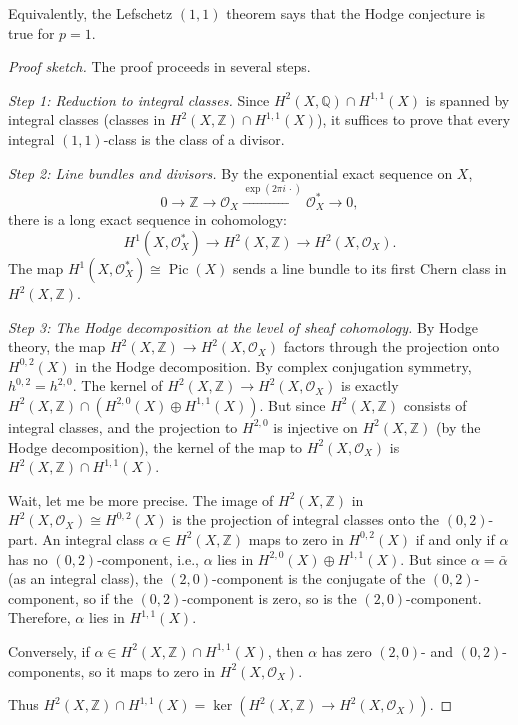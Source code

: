 Equivalently, the Lefschetz $(1,1)$ theorem says that the Hodge conjecture is true for $p = 1$.

\begin{proof}[Proof sketch]
The proof proceeds in several steps.

\emph{Step 1: Reduction to integral classes.} Since $H^2(X, \mathbb{Q}) \cap H^{1,1}(X)$ is spanned by integral classes (classes in $H^2(X, \mathbb{Z}) \cap H^{1,1}(X)$), it suffices to prove that every integral $(1,1)$-class is the class of a divisor.

\emph{Step 2: Line bundles and divisors.} By the exponential exact sequence on $X$,
\[
0 \to \mathbb{Z} \to \mathcal{O}_X \xrightarrow{\exp(2\pi i \,\cdot)} \mathcal{O}_X^* \to 0,
\]
there is a long exact sequence in cohomology:
\[
H^1(X, \mathcal{O}_X^*) \to H^2(X, \mathbb{Z}) \to H^2(X, \mathcal{O}_X).
\]
The map $H^1(X, \mathcal{O}_X^*) \cong \operatorname{Pic}(X)$ sends a line bundle to its first Chern class in $H^2(X, \mathbb{Z})$.

\emph{Step 3: The Hodge decomposition at the level of sheaf cohomology.} By Hodge theory, the map $H^2(X, \mathbb{Z}) \to H^2(X, \mathcal{O}_X)$ factors through the projection onto $H^{0,2}(X)$ in the Hodge decomposition. By complex conjugation symmetry, $h^{0,2} = h^{2,0}$. The kernel of $H^2(X, \mathbb{Z}) \to H^2(X, \mathcal{O}_X)$ is exactly $H^2(X, \mathbb{Z}) \cap (H^{2,0}(X) \oplus H^{1,1}(X))$. But since $H^2(X, \mathbb{Z})$ consists of integral classes, and the projection to $H^{2,0}$ is injective on $H^2(X, \mathbb{Z})$ (by the Hodge decomposition), the kernel of the map to $H^2(X, \mathcal{O}_X)$ is $H^2(X, \mathbb{Z}) \cap H^{1,1}(X)$.

Wait, let me be more precise. The image of $H^2(X, \mathbb{Z})$ in $H^2(X, \mathcal{O}_X) \cong H^{0,2}(X)$ is the projection of integral classes onto the $(0,2)$-part. An integral class $\alpha \in H^2(X, \mathbb{Z})$ maps to zero in $H^{0,2}(X)$ if and only if $\alpha$ has no $(0,2)$-component, i.e., $\alpha$ lies in $H^{2,0}(X) \oplus H^{1,1}(X)$. But since $\alpha = \bar{\alpha}$ (as an integral class), the $(2,0)$-component is the conjugate of the $(0,2)$-component, so if the $(0,2)$-component is zero, so is the $(2,0)$-component. Therefore, $\alpha$ lies in $H^{1,1}(X)$.

Conversely, if $\alpha \in H^2(X, \mathbb{Z}) \cap H^{1,1}(X)$, then $\alpha$ has zero $(2,0)$- and $(0,2)$-components, so it maps to zero in $H^2(X, \mathcal{O}_X)$.

Thus $H^2(X, \mathbb{Z}) \cap H^{1,1}(X) = \ker(H^2(X, \mathbb{Z}) \to H^2(X, \mathcal{O}_X))$.


\end{proof}
